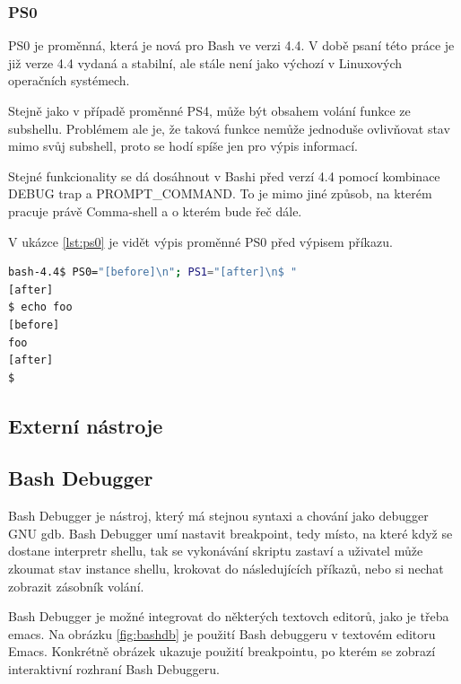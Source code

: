 \documentclass[thesis=M,czech]{FITthesis}[2012/06/26]
\begin{document}
%
%
%
\subsubsection{PS0}

PS0 je proměnná, která je nová pro Bash ve verzi 4.4. V době psaní této práce je již verze 4.4 vydaná a stabilní, ale stále není jako výchozí v Linuxových operačních systémech.

Stejně jako v případě proměnné PS4, může být obsahem volání funkce ze subshellu. Problémem ale je, že taková funkce nemůže jednoduše ovlivňovat stav mimo svůj subshell, proto se hodí spíše jen pro výpis informací.

Stejné funkcionality se dá dosáhnout v Bashi před verzí 4.4 pomocí kombinace DEBUG trap a PROMPT\_COMMAND. To je mimo jiné způsob, na kterém pracuje právě Comma-shell a o kterém bude řeč dále.

V ukázce \ref{lst:ps0} je vidět výpis proměnné PS0 před výpisem příkazu.

\begin{lstlisting}[language=bash, caption={ps0}, label={lst:ps0}]
bash-4.4$ PS0="[before]\n"; PS1="[after]\n$ "
[after]
$ echo foo
[before]
foo
[after]
$
\end{lstlisting}




\subsection{Externí nástroje}



\subsection{Bash Debugger}

Bash Debugger \cite{bashdb} je nástroj, který má stejnou syntaxi a chování jako debugger GNU gdb. Bash Debugger umí nastavit breakpoint, tedy místo, na které když se dostane interpretr shellu, tak se vykonávání skriptu zastaví a uživatel může zkoumat stav instance shellu, krokovat do následujících příkazů, nebo si nechat zobrazit zásobník volání.

Bash Debugger je možné integrovat do některých textovch editorů, jako je třeba emacs. Na obrázku \ref{fig:bashdb} je použití Bash debuggeru v textovém editoru Emacs. Konkrétně obrázek ukazuje použití breakpointu, po kterém se zobrazí interaktivní rozhraní Bash Debuggeru.
\end{document}
